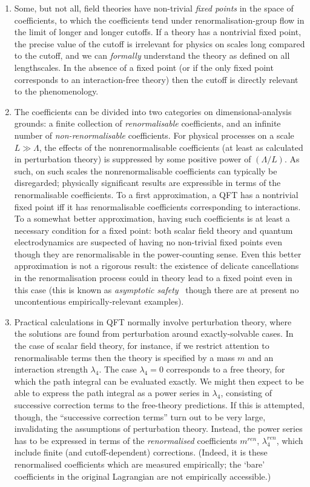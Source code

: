\documentclass[12pt]{article}
\begin{document}
\begin{enumerate}
\item Some, but not all, field theories have non-trivial \emph{fixed points} in the space of coefficients, to which the coefficients tend under renormalisation-group flow in the limit of longer and longer cutoffs. If a theory has a nontrivial fixed point, the precise value of the cutoff is irrelevant for physics on scales long compared to the cutoff, and we can \emph{formally} understand the theory as defined on all lengthscales. In the absence of a fixed point (or if the only fixed point corresponds to an interaction-free theory) then the cutoff is directly relevant to the phenomenology. 
\item The coefficients can be divided into two categories on dimensional-analysis grounds: a finite collection of \emph{renormalisable} coefficients, and an infinite number of \emph{non-renormalisable} coefficients. For physical processes on a scale $L \gg \Lambda$, the effects of the nonrenormalisable coefficients (at least as calculated in perturbation theory) is suppressed by some positive power of $(\Lambda/L)$. As such, on such scales the nonrenormalisable coefficients can typically be disregarded; physically significant results are expressible in terms of the renormalisable coefficients.
To a first approximation, a QFT has a nontrivial fixed point iff it has renormalisable coefficients corresponding to interactions. To a somewhat better approximation, having such coefficients is at least a necessary condition for a fixed point: both scalar field theory and quantum electrodynamics are suspected of having no non-trivial fixed points even though they are renormalisable in the power-counting sense. Even this better approximation is not a rigorous result: the existence of delicate cancellations in the renormalisation process could in theory lead to a fixed point even in this case (this is known as \emph{asymptotic safety}~\cite{weinbergasymptotic} though there are at present no uncontentious empirically-relevant examples).
\item Practical calculations in QFT normally involve perturbation theory, where the solutions are found from perturbation around exactly-solvable cases. In the case of scalar field theory, for instance, if we restrict attention to renormalisable terms then the theory is specified by a mass $m$ and an interaction strength $\lambda_4$. The case $\lambda_4=0$ corresponds to a free theory, for which the path integral can be evaluated exactly. We might then expect to be able to express the path integral as a power series in $\lambda_4$, consisting of successive correction terms to the free-theory predictions. If this is attempted, though, the ``successive correction terms'' turn out to be very large, invalidating the assumptions of perturbation theory. Instead, the power series has to be expressed in terms of the \emph{renormalised} coefficients $m^{ren}$, $\lambda_4^{ren}$, which include finite (and cutoff-dependent) corrections. (Indeed, it is these renormalised coefficients which are measured empirically; the `bare' coefficients in the original Lagrangian are not empirically accessible.)

\end{enumerate}
\end{document}
